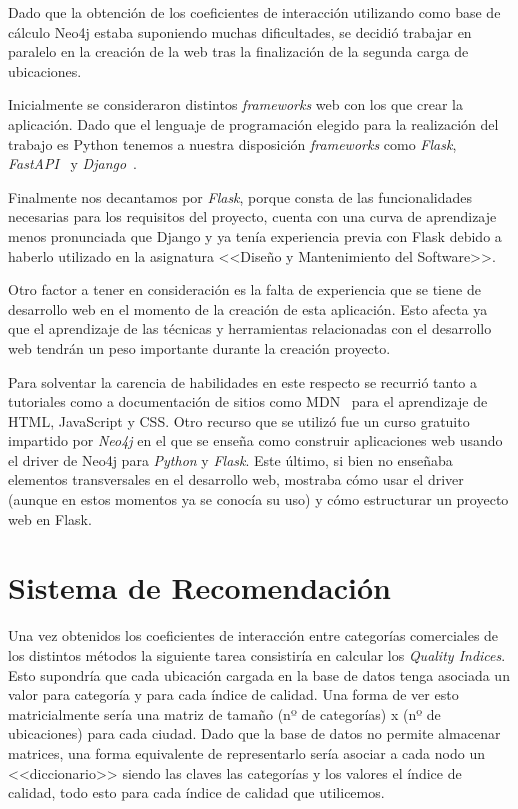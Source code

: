 Dado que la obtención de los coeficientes de interacción utilizando como base de cálculo Neo4j estaba suponiendo muchas dificultades, se decidió trabajar en paralelo en la creación de la web tras la finalización de la segunda carga de ubicaciones.

Inicialmente se consideraron distintos \textit{frameworks} web con los que crear la aplicación. Dado que el lenguaje de programación elegido para la realización del trabajo es Python tenemos a nuestra disposición \textit{frameworks} como \textit{Flask}, \textit{FastAPI}~\cite{FastAPI} y \textit{Django}~\cite{Django}.

Finalmente nos decantamos por \textit{Flask}, porque consta de las funcionalidades necesarias para los requisitos del proyecto, cuenta con una curva de aprendizaje menos pronunciada que Django y ya tenía experiencia previa con Flask debido a haberlo utilizado en la asignatura <<Diseño y Mantenimiento del Software>>.

Otro factor a tener en consideración es la falta de experiencia que se tiene de desarrollo web en el momento de la creación de esta aplicación. Esto afecta ya que el aprendizaje de las técnicas y herramientas relacionadas con el desarrollo web tendrán un peso importante durante la creación proyecto.

Para solventar la carencia de habilidades en este respecto se recurrió tanto a tutoriales como a documentación de sitios como MDN~\cite{mozillaDocs} para el aprendizaje de HTML, JavaScript y CSS. Otro recurso que se utilizó fue un curso gratuito impartido por \textit{Neo4j} en el que se enseña como construir aplicaciones web usando el driver de Neo4j para \textit{Python} y \textit{Flask}. Este último, si bien no enseñaba elementos transversales en el desarrollo web, mostraba cómo usar el driver (aunque en estos momentos ya se conocía su uso) y cómo estructurar un proyecto web en Flask.

\section{Sistema de Recomendación}

Una vez obtenidos los coeficientes de interacción entre categorías comerciales de los distintos métodos la siguiente tarea consistiría en calcular los \textit{Quality Indices}. Esto supondría que cada ubicación cargada en la base de datos tenga asociada un valor para categoría y para cada índice de calidad. Una forma de ver esto matricialmente sería una matriz de tamaño (nº de categorías) x (nº de ubicaciones) para cada ciudad. Dado que la base de datos no permite almacenar matrices, una forma equivalente de representarlo sería asociar a cada nodo un <<diccionario>> siendo las claves las categorías y los valores el índice de calidad, todo esto para cada índice de calidad que utilicemos.

